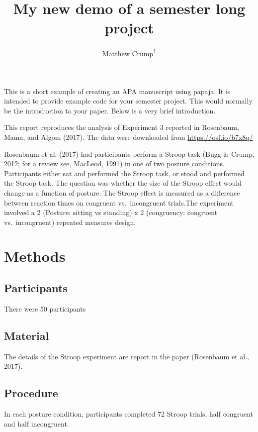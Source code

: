 \documentclass[
  man]{apa6}
\title{My new demo of a semester long project}
\author{Matthew Crump\textsuperscript{1}}
\date{}
\affiliation{\vspace{0.5cm}\textsuperscript{1} Brooklyn College}
\begin{document}
\maketitle

This is a short example of creating an APA manuscript using papaja. It is intended to provide example code for your semester project. This would normally be the introduction to your paper. Below is a very brief introduction.

This report reproduces the analysis of Experiment 3 reported in Rosenbaum, Mama, and Algom (2017). The data were downloaded from \url{https://osf.io/b7x8q/}

Rosenbaum et al. (2017) had participants perform a Stroop task (Bugg \& Crump, 2012; for a review see, MacLeod, 1991) in one of two posture conditions. Participants either sat and performed the Stroop task, or stood and performed the Stroop task. The question was whether the size of the Stroop effect would change as a function of posture. The Stroop effect is measured as a difference between reaction times on congruent vs.~incongruent trials.The experiment involved a 2 (Posture: sitting vs standing) x 2 (congruency: congruent vs.~incongruent) repeated measures design.

\hypertarget{methods}{%
\section{Methods}\label{methods}}

\hypertarget{participants}{%
\subsection{Participants}\label{participants}}

There were 50 participants

\hypertarget{material}{%
\subsection{Material}\label{material}}

The details of the Stroop experiment are report in the paper (Rosenbaum et al., 2017).

\hypertarget{procedure}{%
\subsection{Procedure}\label{procedure}}

In each posture condition, participants completed 72 Stroop trials, half congruent and half incongruent.
\end{document}
